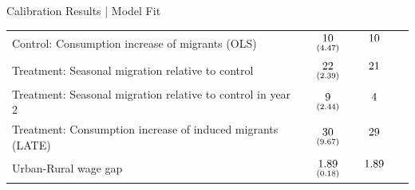 \documentclass[9pt,pdftex,aspectratio=1610]{beamer}
\theoremstyle{definition}
\begin{document}
\begin{frame}[t]{Calibration Results | Model Fit}
\begin{table}[!t]
\begin{center}
\begin{tabular}{l l c c}
Control: Consumption increase of migrants (OLS) &
$\begin{array}{c}10\vspace{-.15cm}\\ \scriptstyle (4.47)\end{array}$ &
$\begin{array}{c}10\vspace{-.15cm}\\ \scriptstyle \phantom{(4.47)}\end{array}$ & \\


Treatment: Seasonal migration relative to control &
 $\begin{array}{c}22\vspace{-.15cm}\\ \scriptstyle (2.39)\end{array}$ &
$\begin{array}{c}21\vspace{-.15cm}\\ \scriptstyle \phantom{(2.39)}\end{array}$ & \\


Treatment: Seasonal migration relative to control in year 2 &
 $\begin{array}{c}9\vspace{-.15cm}\\ \scriptstyle (2.44)\end{array}$ &
$\begin{array}{c}4\vspace{-.15cm}\\ \scriptstyle \phantom{(2.44)}\end{array}$ & \\


Treatment: Consumption increase of induced migrants (LATE)  &
$\begin{array}{c}30\vspace{-.15cm}\\ \scriptstyle (9.67)\end{array}$ &
$\begin{array}{c}29\vspace{-.15cm}\\ \scriptstyle \phantom{(9.67)}\end{array}$ & \\

\hline
Urban-Rural wage gap &
$\begin{array}{c}1.89\vspace{-.15cm}\\ \scriptstyle (0.18)\end{array}$ &
$\begin{array}{c}1.89\vspace{-.15cm}\\ \scriptstyle \phantom{(0.18)}\end{array}$ & \\


\end{tabular}
\end{center}
\end{table}
\end{frame}
\end{document}
